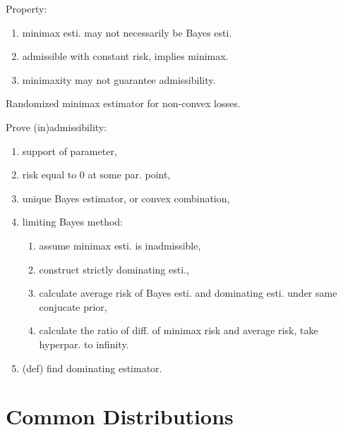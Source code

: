 Property: \begin{enumerate}[
        leftmargin = 2em,
    ]
    \item minimax esti. may not necessarily be Bayes esti.
    \item admissible with constant risk, implies minimax.
    \item minimaxity may not guarantee admissibility.
\end{enumerate}

Randomized minimax estimator for non-convex losses.

Prove (in)admissibility: \begin{enumerate}[
        leftmargin = 2em,
    ]
    \item support of parameter,
    \item risk equal to $0$ at some par. point,
    \item unique Bayes estimator, or convex combination,
    \item limiting Bayes method: \begin{enumerate}
        \item assume minimax esti. is inadmissible,
        \item construct strictly dominating esti.,
        \item calculate average risk of Bayes esti. and dominating esti. under same conjucate prior,
        \item calculate the ratio of diff. of minimax risk and average risk, take hyperpar. to infinity.
    \end{enumerate}
    \item (def) find dominating estimator.
\end{enumerate}







\section*{Common Distributions}

